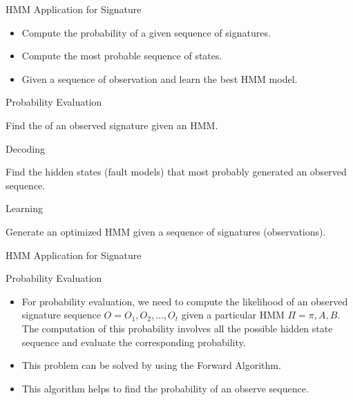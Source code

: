 \documentclass[aspectratio=1610]{beamer}
\begin{document}
\begin{frame}{HMM Application for Signature}

\begin{itemize}
\item Compute the probability of a given sequence of signatures.
\item Compute the most probable sequence of states.
\item Given a sequence of observation and learn the best HMM model.

\end{itemize}

\begin{block}{Probability Evaluation}
\end{block}
Find the of an observed signature given an HMM.




\begin{block}{Decoding}
\end{block}
Find the hidden states (fault models) that most probably generated an observed sequence.



\begin{block}{Learning}

\end{block}
Generate an optimized HMM given a sequence of signatures (observations).



\end{frame}






\begin{frame}{HMM Application for Signature}

\begin{block}{Probability Evaluation}
\end{block}
\begin{itemize}


\item For probability evaluation, we need to compute the likelihood of an observed signature sequence $O = {O_1, O_2,...,O_t}$ given a particular HMM $ \Pi = {\pi, A, B}$. The computation of this probability involves all the possible hidden state sequence and evaluate the corresponding probability. 


\item This problem can be solved by using the Forward Algorithm.

\item  This algorithm helps to find the probability of an observe sequence.
\end{itemize}

\end{frame}
\end{document}
